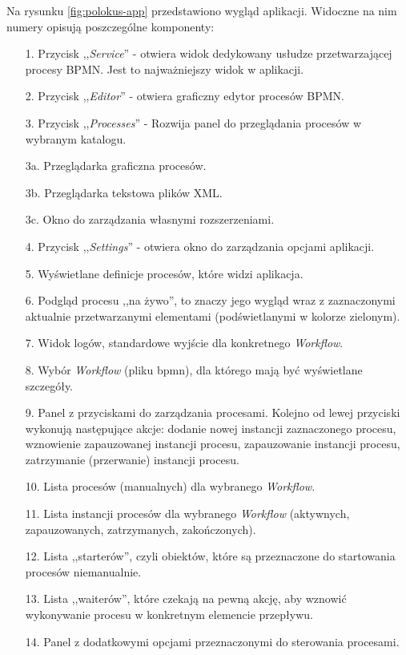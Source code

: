 \documentclass[declaration,shortabstract,mgr]{iithesis}
\begin{document}
Na rysunku \ref{fig:polokus-app} przedstawiono wygląd aplikacji. Widoczne na nim numery opisują poszczególne komponenty:
\begin{enumerate}
\setlength\itemsep{0em}
    \item[1.] Przycisk ,,\textit{Service}'' - otwiera widok dedykowany usłudze przetwarzającej procesy BPMN. Jest to najważniejszy widok w aplikacji.
    \item[2.] Przycisk ,,\textit{Editor}'' - otwiera graficzny edytor procesów BPMN.
    \item[3.] Przycisk ,,\textit{Processes}'' - Rozwija panel do przeglądania procesów w wybranym katalogu.
    \item[3a.] Przeglądarka graficzna procesów.
    \item[3b.] Przeglądarka tekstowa plików XML.
    \item[3c.] Okno do zarządzania własnymi rozszerzeniami.
    \item[4.] Przycisk ,,\textit{Settings}'' - otwiera okno do zarządzania opcjami aplikacji.
    \item[5.] Wyświetlane definicje procesów, które widzi aplikacja.
    \item[6.] Podgląd procesu ,,na żywo'', to znaczy jego wygląd wraz z zaznaczonymi aktualnie przetwarzanymi elementami (podświetlanymi w kolorze zielonym).
    \item[7.] Widok logów, standardowe wyjście dla konkretnego \textit{Workflow}.
    \item[8.] Wybór \textit{Workflow} (pliku bpmn), dla którego mają być wyświetlane szczegóły.
    \item[9.] Panel z przyciskami do zarządzania procesami. Kolejno od lewej przyciski wykonują następujące akcje: dodanie nowej instancji zaznaczonego procesu, wznowienie zapauzowanej instancji procesu, zapauzowanie instancji procesu, zatrzymanie (przerwanie) instancji procesu.
    \item[10.] Lista procesów (manualnych) dla wybranego \textit{Workflow}.
    \item[11.] Lista instancji procesów dla wybranego \textit{Workflow} (aktywnych, zapauzowanych, zatrzymanych, zakończonych).
    \item[12.] Lista ,,starterów'', czyli obiektów, które są przeznaczone do startowania procesów niemanualnie.
    \item[13.] Lista ,,waiterów'', które czekają na pewną akcję, aby wznowić wykonywanie procesu w konkretnym elemencie przepływu.
    \item[14.] Panel z dodatkowymi opcjami przeznaczonymi do sterowania procesami.
\end{enumerate}
\end{document}
